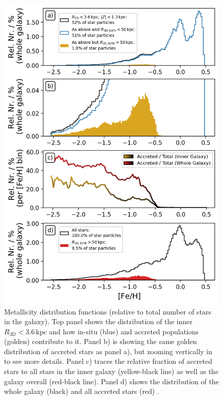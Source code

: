 \documentclass[fleqn,usenatbib]{mnras}
\begin{document}
\begin{figure}
    \centering
    \includegraphics[width=\columnwidth]{figures/fe_h_histogram_inner_galaxy.png}
    \caption{Metallicity distribution functions (relative to total number of stars in the galaxy). Top panel shows the distribution of the inner $R_\mathrm{3D} < 3.6\,\mathrm{kpc}$ and how in-situ (blue) and accreted populations (golden) contribute to it. Panel b) is showing the same golden distribution of accreted stars as panel a), but zooming vertically in to see more details. Panel c) traces the relative fraction of accreted stars to all stars in the inner galaxy (yellow-black line) as well as the galaxy overall (red-black line). Panel d) shows the distribution of the whole galaxy (black) and all accreted stars (red) \href{https://github.com/svenbuder/gse_nihaouhd/tree/main/figures}{\faGithub}.}
    \label{fig:fe_h_histogram_inner_galaxy}
\end{figure}
\end{document}
